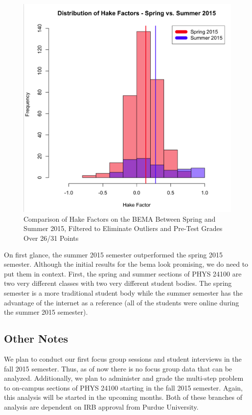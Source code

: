 \begin{figure}[!htb]
	\centering
	\includegraphics[width=6in]{img/chapter4/hake_spring_vs_summer_filtered}
	\caption[Comparison of Hake Factors on the BEMA Between Spring and Summer 2015, Filtered to Eliminate Outliers and Pre-Test Grades Over 26/31 Points ]{Comparison of Hake Factors on the BEMA Between Spring and Summer 2015, Filtered to Eliminate Outliers and Pre-Test Grades Over 26/31 Points}
  \label{fig:hakeFiltered}
\end{figure}

On first glance, the summer 2015 semester outperformed the spring 2015 semester. Although the initial results for the \gls{bema} look promising, we do need to put them in context. First, the spring and summer sections of PHYS 24100 are two very different classes with two very different student bodies. The spring semester is a more traditional student body while the summer semester has the advantage of the internet as a reference (all of the students were online during the summer 2015 semester).

\subsection{Other Notes}

We plan to conduct our first focus group sessions and student interviews in the fall 2015 semester. Thus, as of now there is no focus group data that can be analyzed. Additionally, we plan to administer and grade the multi-step problem to on-campus sections of PHYS 24100 starting in the fall 2015 semester. Again, this analysis will be started in the upcoming months. Both of these branches of analysis are dependent on IRB approval from Purdue University.